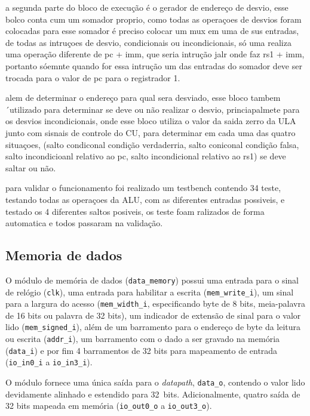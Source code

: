 a segunda parte do bloco de execução é o gerador de endereço de desvio, esse bolco conta cum um somador proprio, como todas as operaçoes de desvios foram colocadas para esse somador é preciso colocar um mux em uma de sus entradas, de todas as intruçoes de desvio, condicionais ou incondicionais, só uma realiza uma operação diferente de pc + imm, que seria  intrução jalr onde faz rs1 + imm, portanto sóemnte quando for essa intrução um das entradas do somador deve ser trocada para o valor de pc para o registrador 1. 


alem de determinar o endereço para qual sera desviado, esse bloco tambem ´utilizado para determinar se deve ou não realizar o desvio, princiapalmete para os desvios incondicionais, onde esse bloco utiliza o valor da saida zerro da ULA junto com sisnais de controle do CU, para determinar em cada uma das quatro situaçoes, (salto condiconal condição verdaderria, salto coniconal condição falsa, salto incondicioanl relativo ao pc, salto incondicional relativo ao rs1) se deve saltar ou não.



para validar o funcionamento foi realizado um testbench contendo 34 teste, testando todas as operaçoes da ALU, com as diferentes entradas possiveis, e testado os 4 diferentes saltos posiveis, os teste foam ralizados de forma automatica e todos passaram na validação.

\subsection{Memoria de dados}
\label{sub:memoeria_dados}

O módulo de memória de dados (\texttt{data\_memory}) possui uma entrada para o sinal de relógio (\texttt{clk}), uma entrada para habilitar a escrita (\texttt{mem\_write\_i}), um sinal para a largura do acesso (\texttt{mem\_width\_i}, especificando byte de 8 bits, meia-palavra de 16 bits ou palavra de 32 bits), um indicador de extensão de sinal para o valor lido (\texttt{mem\_signed\_i}), além de um barramento para o endereço de byte da leitura ou escrita (\texttt{addr\_i}), um barramento com o dado a ser gravado na memória (\texttt{data\_i}) e por fim 4 barramentos de 32 bits para mapeamento de entrada  (\texttt{io\_in0\_i} a \texttt{io\_in3\_i}).


O módulo fornece uma única saída para o \textit{datapath}, \texttt{data\_o}, contendo o valor lido devidamente alinhado e estendido para 32~bits. Adicionalmente, quatro saída de 32 bits mapeada em memória (\texttt{io_out0\_o} a \texttt{io\_out3\_o}).


